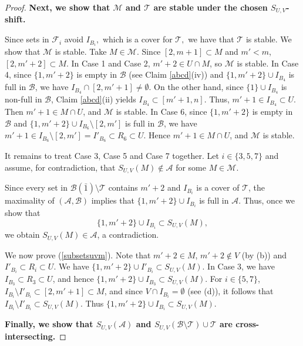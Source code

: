 \documentclass[10pt,a4paper]{amsart}
\def\andrey#1{{\sc Andrey: }{\marrow\sf \textcolor{blue}{#1}}}
\newcommand{\m}{\mathcal}
\def\marrow{{\boldmath {\marginpar[\hfill$\rightarrow \rightarrow$]{$\leftarrow \leftarrow$}}}}
\begin{document}
\begin{proof}



{\bf Next, we show that $\m M$ and $\m T$ are stable under the chosen $S_{U,V}$-shift. }

Since sets in $\m F_i$ avoid $I_{B_i},$ which is a cover for $\m T,$ we have that $\m T$ is stable. 
We show that $\m M$ is stable. Take $M\in\m M$.
Since $[2,m+1]\subset M$ and $m'<m$, $[2,m'+2]\subset M $.
In Case 1 and Case 2, $m'+2\in U \cap M$, so $\m M$ is stable. In Case 4, since $\{1,m'+2\}$ is empty in $\m B$ (see Claim \ref{abcd}(iv)) and $\{1,m'+2\}\cup I_{B_4}$ is full in $\m B$, we have $I_{B_4}\cap [2,m'+1]\ne \emptyset$.
On the other hand, since $\{1\}\cup I_{B_4}$ is non-full in $\m B$, Claim \ref{abcd}(ii) yields $I_{B_4}\subset [m'+1,n]$. Thus, $m'+1\in I_{B_4}\subset U$. Then $m'+1\in M \cap U$, and $\m M$ is stable.  
In Case 6, since $\{1,m'+2\}$ is empty in $\m B$ and $\{1,m'+2\}\cup I_{B_6}\setminus [2,m']$ is full in $\m B$, 
we have $m'+1\in I_{B_6}\setminus [2,m']=I'_{B_6}\subset R_6\subset U$. Hence $m'+1\in M \cap U$, and $\m M$ is stable.

It remains to treat Case 3, Case 5 and Case 7 together. Let $i\in \{3,5,7\}$ and assume, for contradiction, that $S_{U,V}(M)\not\in \m A$ for some $M\in \m M$. 
  
Since every set in $\m B(\bar{1})\setminus \m T$ contains $m'+2$ and $I_{B_i}$ is a cover of $\m T$, the maximality of $(\m A, \m B)$ implies that $\{1,m'+2\} \cup I_{B_i}$ is full in $\m A$. 
Thus, once we show that
\begin{equation}\label{subsetsuvm}
    \{1,m'+2\}\cup I_{B_i}\subset S_{U,V}(M),
\end{equation}
we obtain $S_{U,V}(M)\in \m A$, a contradiction. 

We now prove (\ref{subsetsuvm}).
Note that $m'+2\in M$, $m'+2\not\in V$ (by (b)) and $I'_{B_i}\subset R_i\subset U$. We have $\{1,m'+2\}\cup I'_{B_i}\subset S_{U,V}(M)$. 
In Case 3, we have $I_{B_3}\subset R_3 \subset U$, and hence $\{1,m'+2\}\cup I_{B_3}\subset S_{U,V}(M)$. 
For $i\in \{5,7\}$, $I_{B_i}\setminus I'_{B_i}\subset [2,m'+1]\subset M$, and since $V\cap I_{B_i}=\emptyset$ (see (d)), it follows that $I_{B_i}\setminus I'_{B_i}\subset S_{U,V}(M)$. 
Thus $\{1,m'+2\}\cup I_{B_i}\subset S_{U,V}(M)$.

{\bf Finally,  we show that $S_{U,V}(\m A)$ and $S_{U,V}(\m B\setminus \m T)\cup \m T$
are cross-intersecting.} 


\end{proof}
\end{document}
